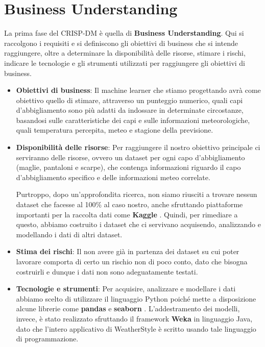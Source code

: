\documentclass[a4paper, 11pt, oneside]{report}
\begin{document}
            \section{Business Understanding}
            La prima fase del CRISP-DM è quella di \textbf{Business Understanding}.
            Qui si raccolgono i requisiti e si definiscono gli obiettivi di business che si intende raggiungere, oltre a
            determinare la disponibilità delle risorse, stimare i rischi, indicare le tecnologie e gli strumenti utilizzati
            per raggiungere gli obiettivi di business.
            \par \noindent
            \begin{itemize}
                \item \textbf{Obiettivi di business}: Il machine learner che stiamo progettando avrà come obiettivo quello di
                stimare, attraverso un punteggio numerico, quali capi d'abbigliamento sono più adatti da indossare in
                determinate circostanze, basandosi
                sulle caratteristiche dei capi e sulle informazioni meteorologiche, quali temperatura percepita, meteo e
                stagione della previsione.
                \item \textbf{Disponibilità delle risorse}: Per raggiungere il nostro obiettivo principale ci serviranno
                delle risorse, ovvero un dataset per ogni capo d'abbigliamento (maglie, pantaloni e scarpe),
                che contenga informazioni riguardo il capo d'abbigliamento specifico e delle informazioni meteo correlate.
                \par \noindent Purtroppo, dopo un'approfondita ricerca, non siamo riusciti a trovare nessun dataset che facesse
                al 100\% al caso nostro, anche sfruttando piattaforme importanti per la raccolta dati come \textbf{Kaggle} \cite{3}.
                Quindi, per rimediare a questo, abbiamo costruito i dataset che ci servivano acquisendo, analizzando e modellando
                i dati di altri dataset.
                \item \textbf{Stima dei rischi}: Il non avere già in partenza dei dataset su cui poter lavorare comporta
                di certo un rischio non di poco conto, dato che bisogna costruirli e dunque i dati non sono adeguatamente testati.
                \item \textbf{Tecnologie e strumenti}: Per acquisire, analizzare e modellare i dati abbiamo scelto di utilizzare
                il linguaggio Python poiché mette a disposizione alcune librerie come \textbf{pandas} \cite{4} e \textbf{seaborn} \cite{5}.
                L'addestramento dei modelli, invece, è stato realizzato
                sfruttando il framework \textbf{Weka} \cite{2} in linguaggio Java, dato che l'intero applicativo di WeatherStyle
                è scritto usando tale linguaggio di programmazione.
            \end{itemize}
\end{document}
